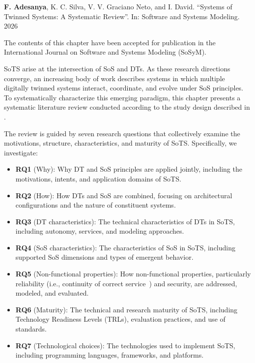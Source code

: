 \begin{publicationbox}{\resizebox{0.5cm}{!}{\faFileText}}
    \textbf{F. Adesanya}, K. C. Silva, V. V. Graciano Neto, and I. David. ``Systems of Twinned Systems: A Systematic Review''. In: Software and Systems Modeling. 2026

    \tcblower
    
    The contents of this chapter have been accepted for publication in the International Journal on Software and Systems Modeling (SoSyM).
\end{publicationbox}

SoTS arise at the intersection of SoS and DTs. As these research directions converge, an increasing body of work describes systems in which multiple digitally twinned systems interact, coordinate, and evolve under SoS principles. To systematically characterize this emerging paradigm, this chapter presents a systematic literature review conducted according to the study design described in .

The review is guided by seven research questions that collectively examine the motivations, structure, characteristics, and maturity of SoTS. Specifically, we investigate:

\begin{itemize}
    \item \textbf{RQ1} (Why): Why DT and SoS principles are applied jointly, including the motivations, intents, and application domains of SoTS.
    
    \item \textbf{RQ2} (How): How DTs and SoS are combined, focusing on architectural configurations and the nature of constituent systems.
    
    \item \textbf{RQ3} (DT characteristics): The technical characteristics of DTs in SoTS, including autonomy, services, and modeling approaches.
    
    \item \textbf{RQ4} (SoS characteristics): The characteristics of SoS in SoTS, including supported SoS dimensions and types of emergent behavior.
    
    \item \textbf{RQ5} (Non-functional properties): How non-functional properties, particularly reliability (i.e., continuity of correct service~\cite{avizienis2004basic}) and security, are addressed, modeled, and evaluated.
    
    \item \textbf{RQ6} (Maturity): The technical and research maturity of SoTS, including Technology Readiness Levels (TRLs), evaluation practices, and use of standards.
    
    \item \textbf{RQ7} (Technological choices): The technologies used to implement SoTS, including programming languages, frameworks, and platforms.
\end{itemize}

